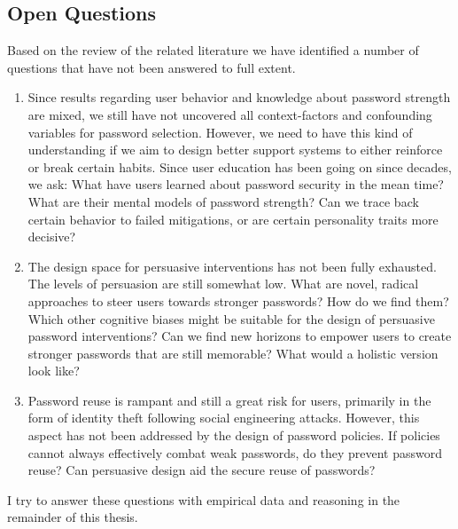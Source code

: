 \subsection*{Open Questions}
Based on the review of the related literature we have identified a number of questions that have not been answered to full extent. 
\begin{enumerate}
	\item Since results regarding user behavior and knowledge about password strength are mixed, we still have not uncovered all context-factors and confounding variables for password selection. However, we need to have this kind of understanding if we aim to design better support systems to either reinforce or break certain habits. Since user education has been going on since decades, we ask: What have users learned about password security in the mean time? What are their mental models of password strength? Can we trace back certain behavior to failed mitigations, or are certain personality traits more decisive?
	
	\item The design space for persuasive interventions has not been fully exhausted. The levels of persuasion are still somewhat low. What are novel, radical approaches to steer users towards stronger passwords? How do we find them? Which other cognitive biases might be suitable for the design of persuasive password interventions? Can we find new horizons to empower users to create stronger passwords that are still memorable? What would a holistic version look like?
	
	\item Password reuse is rampant and still a great risk for users, primarily in the form of identity theft following social engineering attacks. However, this aspect has not been addressed by the design of password policies. If policies cannot always effectively combat weak passwords, do they prevent password reuse? Can persuasive design aid the secure reuse of passwords?
\end{enumerate}

I try to answer these questions with empirical data and reasoning in the remainder of this thesis.


